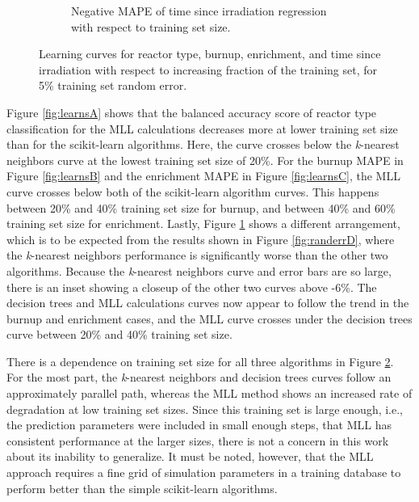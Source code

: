 \begin{figure}[!htb]
\begin{subfigure}[b]{0.49\textwidth}
    \caption{Negative \gls{MAPE} of time since irradiation regression with 
             respect to training set size.}
    \label{fig:learnsD}
  \end{subfigure}
  \caption{Learning curves for reactor type, burnup, enrichment, and time 
           since irradiation with respect to increasing fraction of the 
           training set, for 5\% training set random error.}
  \label{fig:learns}
\end{figure}

Figure \ref{fig:learnsA} shows that the balanced accuracy score of reactor type
classification for the \gls{MLL} calculations decreases more at lower training
set size than for the scikit-learn algorithms. Here, the curve crosses below
the \textit{k}-nearest neighbors curve at the lowest training set size of 20\%.
For the burnup \gls{MAPE} in Figure \ref{fig:learnsB} and the enrichment
\gls{MAPE} in Figure \ref{fig:learnsC}, the \gls{MLL} curve crosses below both
of the scikit-learn algorithm curves. This happens between 20\% and 40\%
training set size for burnup, and between 40\% and 60\% training set size for
enrichment.  Lastly, Figure \ref{fig:learnsD} shows a different arrangement,
which is to be expected from the results shown in Figure \ref{fig:randerrD},
where the \textit{k}-nearest neighbors performance is significantly worse than
the other two algorithms. Because the \textit{k}-nearest neighbors curve and
error bars are so large, there is an inset showing a closeup of the other two
curves above -6\%.  The decision trees and \gls{MLL} calculations curves now
appear to follow the trend in the burnup and enrichment cases, and the
\gls{MLL} curve crosses under the decision trees curve between 20\% and 40\%
training set size.  

There is a dependence on training set size for all three algorithms in Figure
\ref{fig:learns}. For the most part, the \textit{k}-nearest neighbors and
decision trees curves follow an approximately parallel path, whereas the
\gls{MLL} method shows an increased rate of degradation at low training set
sizes. Since this training set is large enough, i.e., the prediction parameters
were included in small enough steps, that \gls{MLL} has consistent performance
at the larger sizes, there is not a concern in this work about its inability to
generalize. It must be noted, however, that the \gls{MLL} approach requires a
fine grid of simulation parameters in a training database to perform better
than the simple scikit-learn algorithms.

